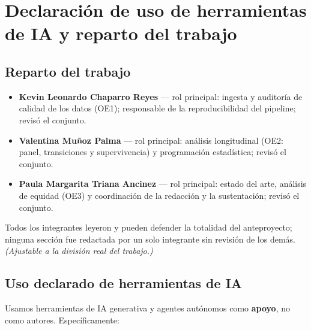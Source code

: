 \section{Declaración de uso de herramientas de IA y reparto del trabajo}

\subsection{Reparto del trabajo}

\begin{itemize}
  \item \textbf{Kevin Leonardo Chaparro Reyes} — rol principal: ingesta y
        auditoría de calidad de los datos (OE1); responsable de la
        reproducibilidad del pipeline; revisó el conjunto.
  \item \textbf{Valentina Muñoz Palma} — rol principal: análisis longitudinal
        (OE2: panel, transiciones y supervivencia) y programación estadística;
        revisó el conjunto.
  \item \textbf{Paula Margarita Triana Ancinez} — rol principal: estado del
        arte, análisis de equidad (OE3) y coordinación de la redacción y la
        sustentación; revisó el conjunto.
\end{itemize}
Todos los integrantes leyeron y pueden defender la totalidad del anteproyecto;
ninguna sección fue redactada por un solo integrante sin revisión de los demás.
\textit{(Ajustable a la división real del trabajo.)}

\subsection{Uso declarado de herramientas de IA}

Usamos herramientas de IA generativa y agentes autónomos como \textbf{apoyo},
no como autores. Específicamente:

